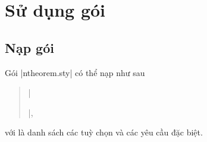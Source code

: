 \documentclass[11pt,oneside]{ltxdoc}
\theoremstyle{marginbreak}
\theoremstyle{changebreak}
\theoremstyle{change}
\theoremstyle{plain}
\theoremstyle{nonumberplain}
\begin{document}
\section{Sử dụng gói}

\subsection{Nạp gói}

Gói |ntheorem.sty| có thể nạp như sau
\begin{quote}
|\usepackage[||]{ntheorem.sty}|,
\end{quote}
với  là danh sách các tuỳ chọn và các yêu cầu đặc biệt.
\end{document}

